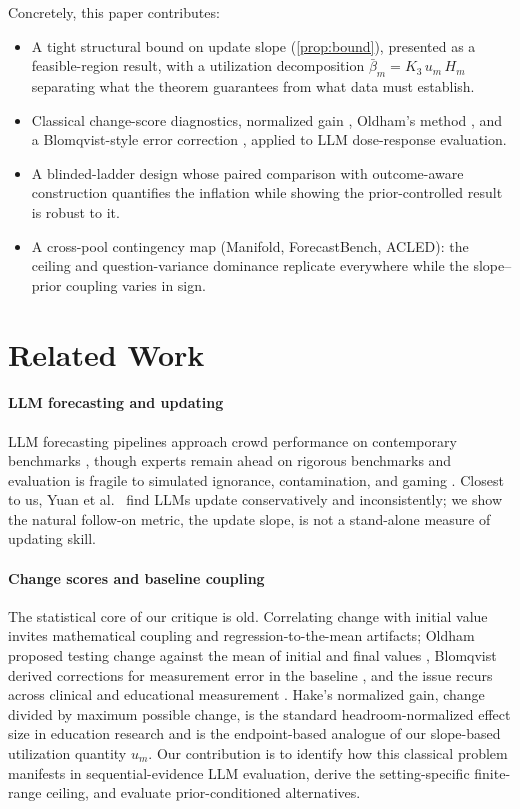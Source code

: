 \documentclass[conference]{IEEEtran}
\theoremstyle{plain}
\theoremstyle{remark}
\begin{document}
Concretely, this paper contributes:
\begin{itemize}
  \item A tight structural bound on update slope (\cref{prop:bound}), presented as a feasible-region result, with a utilization decomposition $\bar\beta_m = K_3\,u_m\,H_m$ separating what the theorem guarantees from what data must establish.
  \item Classical change-score diagnostics, normalized gain \citep{hake1998interactive}, Oldham's method \citep{oldham1962note}, and a Blomqvist-style error correction \citep{blomqvist1977relation}, applied to LLM dose-response evaluation.
  \item A blinded-ladder design whose paired comparison with outcome-aware construction quantifies the inflation while showing the prior-controlled result is robust to it.
  \item A cross-pool contingency map (Manifold, ForecastBench, ACLED): the ceiling and question-variance dominance replicate everywhere while the slope--prior coupling varies in sign.
\end{itemize}

\section{Related Work}

\paragraph{LLM forecasting and updating}
LLM forecasting pipelines approach crowd performance on contemporary benchmarks \citep{halawi2024approaching,schoenegger2024wisdom,alur2025aia}, though experts remain ahead on rigorous benchmarks \citep{karger2024forecastbench} and evaluation is fragile to simulated ignorance, contamination, and gaming \citep{li2026simulated,paleka2025pitfalls}. Closest to us, Yuan et al.~\citep{yuan2025assessing} find LLMs update conservatively and inconsistently; we show the natural follow-on metric, the update slope, is not a stand-alone measure of updating skill.

\paragraph{Change scores and baseline coupling}
The statistical core of our critique is old. Correlating change with initial value invites mathematical coupling and regression-to-the-mean artifacts; Oldham proposed testing change against the mean of initial and final values \citep{oldham1962note}, Blomqvist derived corrections for measurement error in the baseline \citep{blomqvist1977relation}, and the issue recurs across clinical and educational measurement \citep{tu2007revisiting}. Hake's normalized gain, change divided by maximum possible change, is the standard headroom-normalized effect size in education research \citep{hake1998interactive} and is the endpoint-based analogue of our slope-based utilization quantity $u_m$. Our contribution is to identify how this classical problem manifests in sequential-evidence LLM evaluation, derive the setting-specific finite-range ceiling, and evaluate prior-conditioned alternatives.
\end{document}
